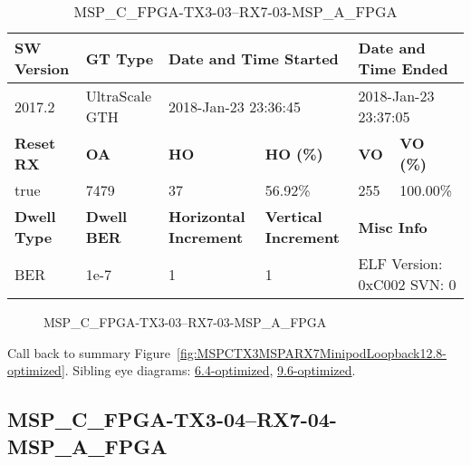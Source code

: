 \begin{table}[h]
\centering
\caption{MSP\_C\_FPGA-TX3-03--RX7-03-MSP\_A\_FPGA}
\label{tab:MSPCFPGATX303RX703MSPAFPGA12.8-optimized}
\begin{tabular}{@{}|l|l|l|l|l|l|@{}}
\toprule
\textbf{SW Version}                & \textbf{GT Type}   & \multicolumn{2}{l|}{\textbf{Date and Time Started}}            & \multicolumn{2}{l|}{\textbf{Date and Time Ended}}        \\ \midrule
2017.2                       & UltraScale GTH          & \multicolumn{2}{l|}{2018-Jan-23 23:36:45}                   & \multicolumn{2}{l|}{2018-Jan-23 23:37:05}               \\ \midrule
\textbf{Reset RX}                  & \textbf{OA} & \textbf{HO}   & \textbf{HO (\%)} & \textbf{VO} & \textbf{VO (\%)} \\ \midrule
true & 7479        & 37          & 56.92\%        & 255        & 100.00\%       \\ \midrule
\textbf{Dwell Type}                & \textbf{Dwell BER} & \textbf{Horizontal Increment} & \textbf{Vertical Increment}    & \multicolumn{2}{l|}{\textbf{Misc Info}}                  \\ \midrule
BER                            & 1e-7        & 1        & 1           & \multicolumn{2}{l|}{ELF Version: 0xC002 SVN: 0}                         \\ \bottomrule
\end{tabular}
\end{table}

\begin{figure}[h]
\caption{MSP\_C\_FPGA-TX3-03--RX7-03-MSP\_A\_FPGA} \label{fig:MSPCFPGATX303RX703MSPAFPGA12.8-optimized}
\end{figure}

Call back to summary Figure~\ref{fig:MSPCTX3MSPARX7MinipodLoopback12.8-optimized}.
Sibling eye diagrams: \hyperref[sec:MSPCFPGATX303RX703MSPAFPGA6.4-optimized]{6.4-optimized}, \hyperref[sec:MSPCFPGATX303RX703MSPAFPGA9.6-optimized]{9.6-optimized}.

\clearpage
\newpage


\subsection{MSP\_C\_FPGA-TX3-04--RX7-04-MSP\_A\_FPGA}\label{sec:MSPCFPGATX304RX704MSPAFPGA12.8-optimized}


